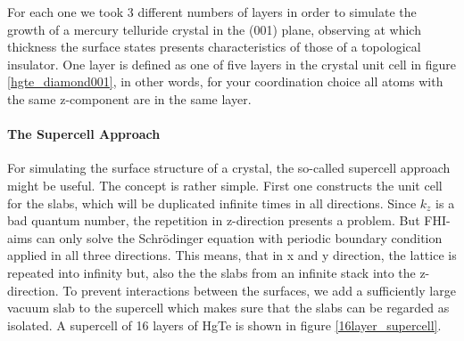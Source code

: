 		For each one we took 3 different numbers of layers in order to simulate the growth of a mercury telluride crystal in the (001) plane, observing at which thickness the surface states presents characteristics of those of a topological insulator. One layer is defined as one of five layers in the crystal unit cell in figure \ref{hgte_diamond001}, in other words, for your coordination choice all atoms with the same z-component are in the same layer.
		 
	\paragraph{The Supercell Approach}
		For simulating the surface structure of a crystal, the so-called supercell approach might be useful. The concept is rather simple. First one constructs the unit cell for the slabs, which will be duplicated infinite times in all directions. Since $k_z$ is a bad quantum number, the repetition in z-direction presents a problem. But FHI-aims can only solve the Schrödinger equation with periodic boundary condition applied in all three directions. This means, that in x and y direction, the lattice is repeated into infinity but, also the the slabs from an infinite stack into the z-direction.
		To prevent interactions between the surfaces, we add a sufficiently large vacuum slab to the supercell which makes sure that the slabs can be regarded as isolated. 
		A supercell of 16 layers of HgTe is shown in figure \ref{16layer_supercell}.
	

